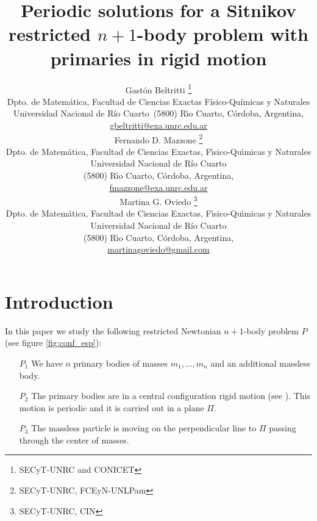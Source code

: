 \documentclass[twoside]{article}
\title{Periodic solutions for a Sitnikov restricted $n+1$-body problem with primaries in rigid motion}
\author{Gast\'on Beltritti \thanks{SECyT-UNRC and CONICET}\\
Dpto. de Matem\'atica, Facultad de Ciencias Exactas Físico-Químicas y Naturales\\
Universidad Nacional de R\'{i}o Cuarto\
(5800) R\'{\i}o Cuarto, C\'ordoba, Argentina,\\
\url{gbeltritti@exa.unrc.edu.ar}\\[3mm]
Fernando D. Mazzone \thanks{SECyT-UNRC, FCEyN-UNLPam}\\
Dpto. de Matem\'atica, Facultad de Ciencias Exactas, F\'{\i}sico-Qu\'{\i}micas y Naturales\\
Universidad Nacional de R\'{i}o Cuarto\\
(5800) R\'{\i}o Cuarto, C\'ordoba, Argentina,\\
\url{fmazzone@exa.unrc.edu.ar}\\
Martina G. Oviedo \thanks{SECyT-UNRC, CIN}\\
Dpto. de Matem\'atica, Facultad de Ciencias Exactas, F\'{\i}sico-Qu\'{\i}micas y Naturales\\
Universidad Nacional de R\'{i}o Cuarto\\
(5800) R\'{\i}o Cuarto, C\'ordoba, Argentina,\\
\url{martinagoviedo@gmail.com}
}
\date{}
\theoremstyle{remark}
\begin{document}
\maketitle
%
%
%
%
%

\begin{abstract}


\end{abstract}




\pagestyle{fancy} \headheight 35pt \fancyhead{} \fancyfoot{}

\fancyfoot[C]{\thepage}  \fancyhead[CO]{\nouppercase{\section}}

\fancyhead[CO]{\nouppercase{\leftmark}}






\section{Introduction}
In this paper we study the following restricted  Newtonian $n+1$-body problem $P$ (see figure \ref{fig:conf_esp}):
\begin{itemize}
 \item[$P_1$] We have $n$ primary bodies of masses $m_1,\ldots,m_n$ and an additional massless body.
 \item[$P_2$] The primary bodies are in a central  configuration rigid motion (see \cite[Section 2.9]{JaumeLlibre276}). This motion is periodic and it is carried out in a plane $\Pi$.
 \item[$P_3$] The massless particle is moving  on the perpendicular line to $\Pi$ passing through the center of masses.
\end{itemize}
\end{document}
